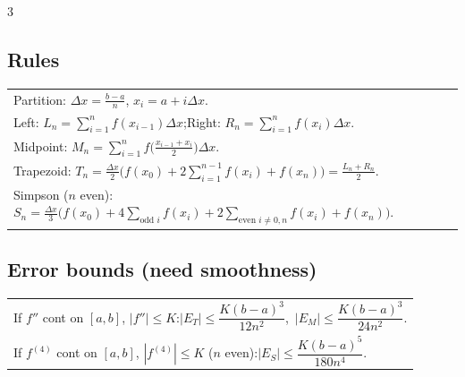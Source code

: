 \documentclass[10pt]{article}
\begin{document}
\begin{multicols}{3}
\subsection*{Rules}
\vspace{-1pt}
\begin{tabular}{@{}p{}@{}}
Partition: $\Delta x=\frac{b-a}{n}$, $x_i=a+i\Delta x$.\\
Left: $L_n=\sum_{i=1}^n f(x_{i-1})\Delta x$;\quad Right: $R_n=\sum_{i=1}^n f(x_i)\Delta x$.\\
Midpoint: $M_n=\sum_{i=1}^n f\big(\frac{x_{i-1}+x_i}{2}\big)\Delta x$.\\
Trapezoid: $T_n=\frac{\Delta x}{2}\big(f(x_0)+2\sum_{i=1}^{n-1}f(x_i)+f(x_n)\big)=\frac{L_n+R_n}{2}$.\\
Simpson (\(n\) even): $S_n=\frac{\Delta x}{3}\big(f(x_0)+4\sum_{\text{odd }i}f(x_i)+2\sum_{\text{even }i\neq 0,n}f(x_i)+f(x_n)\big)$.\\
\end{tabular}

\subsection*{Error bounds (need smoothness)}
\vspace{-1pt}
\begin{tabular}{@{}p{}@{}}
If $f''$ cont on $[a,b]$, $|f''|\le K$:\quad $|E_T|\le\dfrac{K(b-a)^3}{12n^2}$,\ $|E_M|\le\dfrac{K(b-a)^3}{24n^2}$.\\
If $f^{(4)}$ cont on $[a,b]$, $|f^{(4)}|\le K$ (\(n\) even):\quad $|E_S|\le\dfrac{K(b-a)^5}{180n^4}$.\\
\end{tabular}

\end{multicols}
\end{document}
